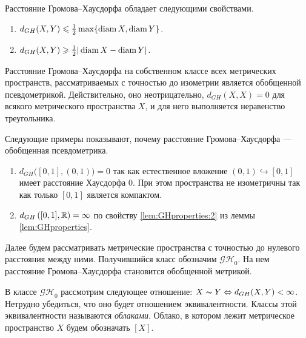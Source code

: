 \begin{lemma}
  \label{lem:GHproperties}
  Расстояние Громова--Хаусдорфа обладает следующими свойствами.
  \begin{enumerate}
    \item \( d_{GH}(X,Y) \leqslant \frac{1}{2}\max\{\operatorname{diam} X, \operatorname{diam} Y\} \).
    \item \( d_{GH}(X,Y) \geqslant \frac{1}{2} | \operatorname{diam} X - \operatorname{diam} Y |\).
      \label{lem:GHproperties:2}
  \end{enumerate}
\end{lemma}
Расстояние Громова--Хаусдорфа на собственном классе всех метрических
пространств, рассматриваемых с точностью до изометрии является
обобщенной псевдометрикой. Действительно, оно неотрицательно, \(
d_{GH}(X,X) = 0 \) для всякого метрического пространства \( X \), и
для него выполняется неравенство треугольника.
\begin{example} Следующие примеры показывают, почему расстояние
  Громова--Хаусдорфа --- обобщенная псевдометрика.
  \begin{enumerate}
    \item \( d_{GH}\big([0,1],(0,1)\big) =0\) так как естественное
      вложение \( (0,1) \hookrightarrow [0,1] \) имеет расстояние
      Хаусдорфа \( 0 \). При этом пространства не изометричны так как
      только \( [0,1] \) является компактом.
    \item \( d_{GH}\left([0,1], \mathbb R\right)  = \infty\) по свойству
      \ref{lem:GHproperties:2} из леммы \ref{lem:GHproperties}.
  \end{enumerate}
\end{example}
Далее будем рассматривать метрические пространства с точностью до
нулевого расстояния между ними. Получившийся класс обозначим \(
\mathcal{GH}_0 \). На нем расстояние Громова--Хаусдорфа становится
обобщенной метрикой.

\begin{definition} В классе $\mathcal{GH}_{0}$
  рассмотрим следующее
  отношение: $X \thicksim Y \Leftrightarrow d_{GH}(X, Y) < \infty$. Нетрудно
  убедиться, что оно будет отношением эквивалентности. Классы этой
  эквивалентности
  называются \emph{облаками}. Облако, в котором лежит метрическое
  пространство $X$
  будем обозначать $[X]$.
\end{definition}

